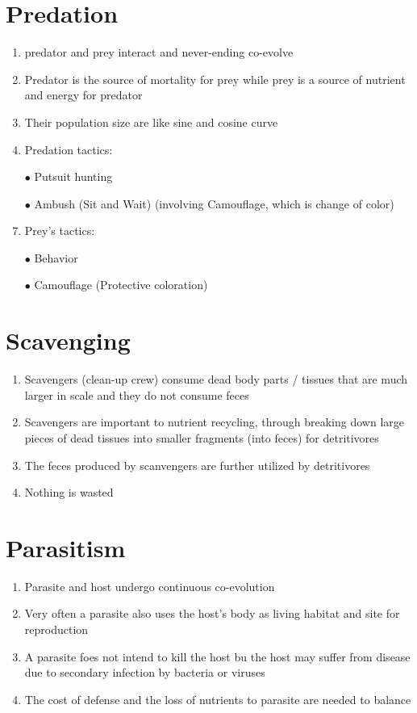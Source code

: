 \documentclass{report}
\begin{document}
\section{Predation} 
\begin{enumerate}
    \item predator and prey interact and never-ending co-evolve 
    \item Predator is the source of mortality for prey while prey is a source of nutrient and energy for predator 
    \item Their population size are like sine and cosine curve
    \item Predation tactics:
    \item [$\bullet$]Putsuit hunting
    \item [$\bullet$]Ambush (Sit and Wait) (involving Camouflage, which is change of color)
    \item Prey's tactics:
    \item [$\bullet$]Behavior 
    \item [$\bullet$]Camouflage (Protective coloration)
\end{enumerate}


\section{Scavenging}
\begin{enumerate}
    \item Scavengers (clean-up crew) consume dead body parts / tissues that are much larger in scale and they do not consume feces 
    \item Scavengers are important to nutrient recycling, through breaking down large pieces of dead tissues into smaller fragments (into feces) for detritivores 
    \item The feces produced by scanvengers are further utilized by detritivores
    \item Nothing is wasted
\end{enumerate}


\section{Parasitism}
\begin{enumerate}
    \item Parasite and host undergo continuous co-evolution
    \item Very often a parasite also uses the host’s body as living habitat and site for reproduction
    \item A parasite foes not intend to kill the host bu the host may suffer from disease due to secondary infection by bacteria or viruses 
    \item The cost of defense and the loss of nutrients to parasite are needed to balance 
\end{enumerate}
\end{document}
